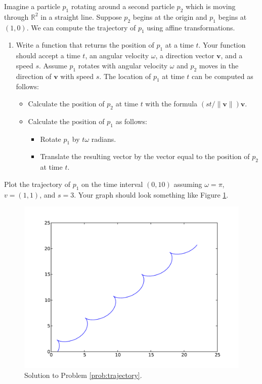 \begin{problem}
Imagine a particle $p_1$ rotating around a second particle $p_2$ which is moving through $\mathbb{R}^2$ in a straight line. Suppose $p_2$ begins at the origin and $p_1$ begins at $(1, 0)$. We can compute the trajectory of $p_1$ using affine transformations.

\begin{enumerate}\label{prob:trajectory}
\item Write a function that returns the position of $p_1$ at a time $t$. Your function should accept a time $t$, an angular velocity $\omega$, a direction vector $\mathbf{v}$, and a speed $s$. Assume $p_1$ rotates with angular velocity $\omega$ and $p_2$ moves in the direction of $\mathbf{v}$ with speed $s$.
The location of $p_1$ at time $t$ can be computed as follows:
\begin{itemize}
\item Calculate the position of $p_2$ at time $t$ with the formula $(st/\|\mathbf{v}\|) \mathbf{v}$.
\item Calculate the position of $p_1$ as follows:
\begin{itemize}
\item Rotate $p_1$ by $t\omega$ radians.
\item Translate the resulting vector by the vector equal to the position of $p_2$ at time $t$.
\end{itemize}
\end{itemize}
\end{enumerate}
\item Plot the trajectory of $p_1$ on the time interval $(0, 10)$ assuming $\omega=\pi$, $v=(1, 1)$, and $s=3$. Your graph should look something like Figure \ref{fig:trajectory}.
\begin{figure}[H]
\includegraphics[width=\textwidth]{trajectory.pdf}
\caption{Solution to Problem \ref{prob:trajectory}.}
\label{fig:trajectory} 
\end{figure}
\end{problem}

